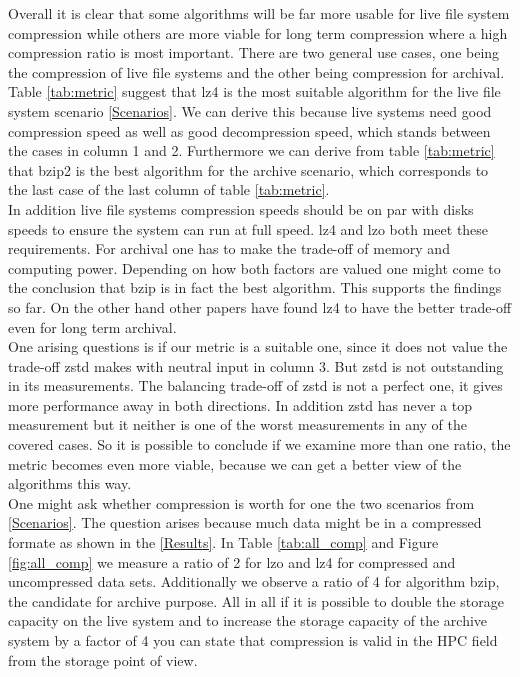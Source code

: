 \documentclass[
	12pt,
	a4paper,
	BCOR10mm,
	DIV14,
	listof=totoc,
	bibliography=totoc,
	headsepline
]{scrreprt}
\begin{document}
Overall it is clear that some algorithms will be far more usable for live file system compression while others are more viable for long term compression where a high compression ratio is most important.
There are two general use cases, one being the compression of live file systems and the other being compression for archival.
\\
Table \ref{tab:metric} suggest that lz4 is the most suitable algorithm for the live file system scenario \ref{Scenarios}.
We can derive this because live systems need good compression speed as well as good decompression speed, which stands between the cases in column 1 and 2.
Furthermore we can derive from table \ref{tab:metric} that bzip2 is the best algorithm for the archive scenario, which corresponds to the last case of the last column of table \ref{tab:metric}.
\\
In addition live file systems compression speeds should be on par with disks speeds to ensure the system can run at full speed.
lz4 and lzo both meet these requirements.
For archival one has to make the trade-off of memory and computing power.
Depending on how both factors are valued one might come to the conclusion that bzip is in fact the best algorithm.
This supports the findings so far.
On the other hand other papers have found lz4 to have the better trade-off even for long term archival\cite{PPerfHPC}.
\\
One arising questions is if our metric is a suitable one, since it does not value the trade-off zstd makes with neutral input in column 3.
But zstd is not outstanding in its measurements.
The balancing trade-off of zstd is not a perfect one, it gives more performance away in both directions.
In addition zstd has never a top measurement but it neither is one of the worst measurements in any of the covered cases.
So it is possible to conclude if we examine more than one ratio, the metric becomes even more viable, because we can get a better view of the algorithms this way.
\\
One might ask whether compression is worth for one the two scenarios from \ref{Scenarios}.
The question arises because much data might be in a compressed formate as shown in the \ref{Results}.
In Table \ref{tab:all_comp} and Figure \ref{fig:all_comp} we measure a ratio of 2 for lzo and lz4 for compressed and uncompressed data sets.
Additionally we observe a ratio of 4 for algorithm bzip, the candidate for archive purpose.
All in all if it is possible to double the storage capacity on the live system and to increase the storage capacity of the archive system by a factor of 4 you can state that compression is valid in the HPC field from the storage point of view.
\end{document}
